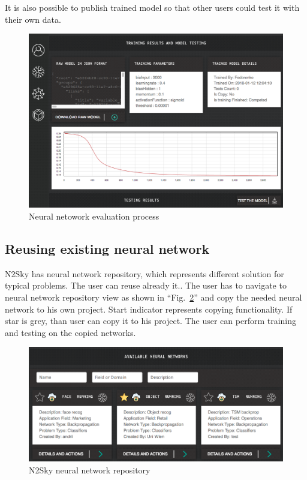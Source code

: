 \documentclass[conference]{IEEEtran}
\begin{document}
It is also possible to publish trained model so that other users could test it with their own data.


\begin{figure}[H]
  \includegraphics[width=\linewidth]{eval.png}
  \caption{Neural netowork evaluation process}
  \label{fig:eval}
\end{figure}

\subsection{Reusing existing neural network}

 N2Sky has neural network repository, which represents different solution for typical problems. The user can reuse already it.. The user has to navigate to neural network repository view as shown in ``Fig.~\ref{fig:repo}''  and copy the needed neural network to his own project. Start indicator represents copying functionality. If star is grey, than user can copy it to his project.  The user can perform training and testing on the copied networks. 

\begin{figure}[H]
  \includegraphics[width=\linewidth]{repo.png}
  \caption{N2Sky neural network repository}
  \label{fig:repo}
\end{figure}
\end{document}
